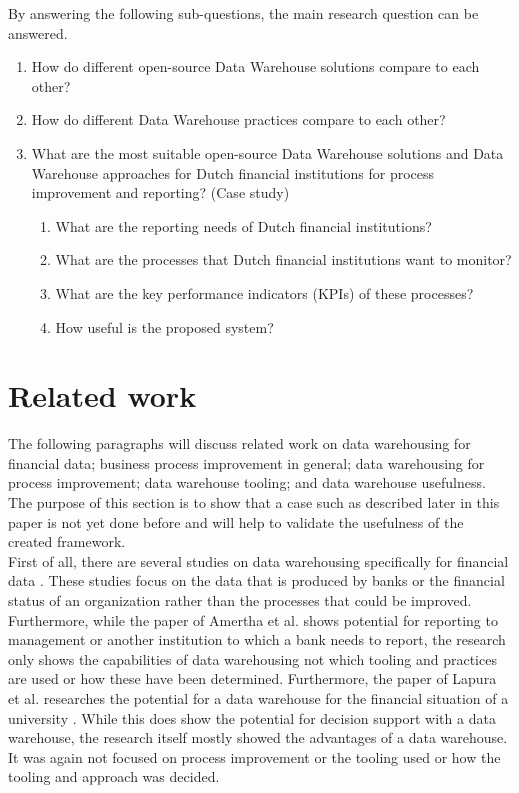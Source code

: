 \documentclass[11pt]{article}
\begin{document}
By answering the following sub-questions, the main research question can be answered.
\begin{enumerate}
  \item How do different open-source Data Warehouse solutions compare to each other?
  \item How do different Data Warehouse practices compare to each other?
  \item What are the most suitable open-source Data Warehouse solutions and Data Warehouse approaches for Dutch financial institutions for process improvement and reporting? (Case study)  
  \begin{enumerate}
    \item What are the reporting needs of Dutch financial institutions?
    \item What are the processes that Dutch financial institutions want to monitor?
    \item What are the key performance indicators (KPIs) of these processes?
    \item How useful is the proposed system? \label{rq:usefulness}
  \end{enumerate}
\end{enumerate}

\section{Related work}
\label{related}
The following paragraphs will discuss related work on data warehousing for financial data; business process improvement in general; data warehousing for process improvement; data warehouse tooling; and data warehouse usefulness. The purpose of this section is to show that a case such as described later in this paper is not yet done before and will help to validate the usefulness of the created framework. \\

First of all, there are several studies on data warehousing specifically for financial data \cite{amertha2020data, lapura2018development}. These studies focus on the data that is produced by banks or the financial status of an organization rather than the processes that could be improved. Furthermore, while the paper of Amertha et al. \cite{amertha2020data} shows potential for reporting to management or another institution to which a bank needs to report, the research only shows the capabilities of data warehousing not which tooling and practices are used or how these have been determined. Furthermore, the paper of Lapura et al. researches the potential for a data warehouse for the financial situation of a university \cite{lapura2018development}. While this does show the potential for decision support with a data warehouse, the research itself mostly showed the advantages of a data warehouse. It was again not focused on process improvement or the tooling used or how the tooling and approach was decided. \\
\end{document}
